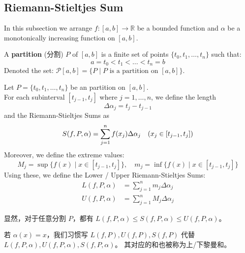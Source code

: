 \documentclass[
	UTF-8,
	11pt, %
	a4paper, %
]{LegrandOrangeBook}
\begin{document}
    \subsection{Riemann-Stieltjes Sum}

    In this subsection we arrange $f: [a, b] \to \mathbb{R} $ be a bounded function and 
        $\alpha$ be a monotonically increasing function on $[a, b]$.

    \begin{definition}[Partition]
    A \textbf{partition} (分割) $P$ of $[a, b]$ is a finite set 
    of points $\{t_0, t_1, \dots, t_n\}$ such that:
    \[ a = t_0 < t_1 < \dots < t_n = b \]
    Denoted the set: $\mathcal{P}[a,b] = \{ P \mid \text{$P$ is a partition on $[a,b]$} \}$.
    \end{definition}

    \begin{definition}
        Let $P = \{t_0, t_1, \dots, t_n\}$ be an partition on $[a,b]$. \\

        For each subinterval $[t_{j-1}, t_j]$ where $j = 1, \dots, n$, 
        we define the length $$\Delta \alpha_j = t_j - t_{j-1}$$ 
        and the Riemann-Stieltjes Sums as
        \[ S(f,P,\alpha) = \sum_{j=1}^{n} f(x_j)\Delta\alpha_j \quad (x_j \in [t_{j-1}, t_j] ) \\ \]
        Moreover, we define the extreme values:
        \[ M_j = \sup \{ f(x) \mid x \in [t_{j-1}, t_j] \}, \quad m_j = \inf \{ f(x) \mid x \in [t_{j-1}, t_j] \} \]
        Using these, we define the Lower / Upper Riemann-Stieltjes Sums:
        \begin{align*}
            L(f, P,\alpha) &= \sum_{j=1}^n m_j \Delta \alpha_j \\
            U(f, P,\alpha) &= \sum_{j=1}^n M_j \Delta \alpha_j
        \end{align*}
    \end{definition}

    \begin{remark}
        显然，对于任意分割 $P$，都有 $L(f, P,\alpha) \le S(f, P,\alpha) \le U(f, P,\alpha)$。
    \end{remark}

    \begin{remark}
        若 $\alpha(x) = x$，我们习惯写 $L(f, P) , U(f, P), S(f, P)$ 代替 $L(f, P,\alpha) , U(f, P,\alpha), S(f, P,\alpha)$。
        其对应的和也被称为上/下黎曼和。
    \end{remark}
\end{document}
